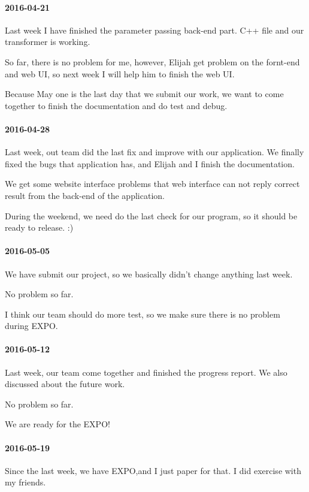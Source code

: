 \paragraph{2016-04-21}
Last week I have finished the parameter passing back-end part. C++ file and our transformer is working.


So far, there is no problem for me, however, Elijah get problem on the fornt-end and web UI, so next week I will help him to finish the web UI.


Because May one is the last day that we submit our work, we want to come together to finish the documentation and do test and debug.

\paragraph{2016-04-28}
Last week, out team did the last fix and improve with our application. We finally fixed the bugs that application has, and Elijah and I finish the documentation.


We get some website interface problems that web interface can not reply correct result from the back-end of the application.


During the weekend, we need do the last check for our program, so it should be ready to release. :)

\paragraph{2016-05-05}
We have submit our project, so we basically didn't change anything last week.


No problem so far.


I think our team should do more test, so we make sure there is no problem during EXPO.

\paragraph{2016-05-12}
Last week, our team come together and finished the progress report. We also discussed about the future work.


No problem so far.


We are ready for the EXPO!

\paragraph{2016-05-19}
Since the last week, we have EXPO,and I just paper for that. I did exercise with my friends.


